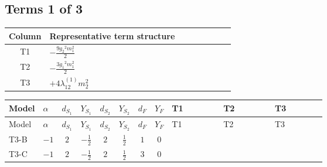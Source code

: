 \documentclass[8pt]{article}
\begin{document}
\begin{landscape}
\subsection*{Terms 1 of 3}
\begin{center}
\begin{tabular}{@{}c >{\raggedright\arraybackslash}p{0.82\linewidth}@{}}
\toprule
Column & Representative term structure \\
\midrule
T1 & \(\displaystyle -\frac{9 {g_2}^2 {m_1^2}}{2}\) \\
\midrule
T2 & \(\displaystyle -\frac{3 {g_1}^2 {m_1^2}}{2}\) \\
\midrule
T3 & \(\displaystyle +4 {\lambda_{12}^{(1)}} {m_2^2}\) \\
\midrule
\bottomrule
\end{tabular}
\end{center}
\smallskip
\tiny
\begin{longtable}{@{}llcccccc >{\raggedright\arraybackslash}p{0.21\linewidth} >{\raggedright\arraybackslash}p{0.21\linewidth} >{\raggedright\arraybackslash}p{0.21\linewidth}@{}}
\toprule
Model & $\alpha$ & $d_{S_1}$ & $Y_{S_1}$ & $d_{S_2}$ & $Y_{S_2}$ & $d_F$ & $Y_F$ & T1 & T2 & T3 \\
\midrule
\endfirsthead
\toprule
Model & $\alpha$ & $d_{S_1}$ & $Y_{S_1}$ & $d_{S_2}$ & $Y_{S_2}$ & $d_F$ & $Y_F$ & T1 & T2 & T3 \\
\midrule
\endhead
T3-B & $-1$ & $2$ & $-\frac{1}{2}$ & $2$ & $\frac{1}{2}$ & $1$ & $0$ & \scriptsize\adjustbox{max width=\linewidth}{$\begin{gathered} -\frac{9 {g_2}^2 {m_1^2}}{2}\end{gathered}$} & \scriptsize\adjustbox{max width=\linewidth}{$\begin{gathered} -\frac{3 {g_1}^2 {m_1^2}}{2}\end{gathered}$} & \scriptsize\adjustbox{max width=\linewidth}{$\begin{gathered} +4 {\lambda_{12}^{(1)}} {m_2^2}\end{gathered}$} \\
\midrule
T3-C & $-1$ & $2$ & $-\frac{1}{2}$ & $2$ & $\frac{1}{2}$ & $3$ & $0$ & \scriptsize\adjustbox{max width=\linewidth}{$\begin{gathered} -\frac{9 {g_2}^2 {m_1^2}}{2}\end{gathered}$} & \scriptsize\adjustbox{max width=\linewidth}{$\begin{gathered} -\frac{3 {g_1}^2 {m_1^2}}{2}\end{gathered}$} & \scriptsize\adjustbox{max width=\linewidth}{$\begin{gathered} +4 {\lambda_{12}^{(1)}} {m_2^2}\end{gathered}$} \\

\end{longtable}
\end{landscape}
\end{document}
